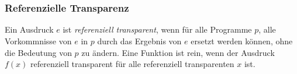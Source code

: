 	\section*{}
		\begin{frame}
			\frametitle{Referenzielle Transparenz}
			\begin{definition}
				Ein Ausdruck $e$ ist \emph{referenziell transparent},
				wenn für alle Programme $p$, alle Vorkommnisse von
				$e$ in $p$ durch das Ergebnis von $e$ ersetzt werden
				können, ohne die Bedeutung von $p$ zu ändern.
				Eine Funktion ist rein, wenn der Ausdruck $f(x)$ 			  
				referenziell transparent für alle referenziell
				transparenten $x$ ist.
			\end{definition} 
		\end{frame}